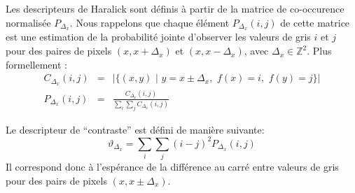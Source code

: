 \documentclass[11pt,addpoints]{exam}
\begin{document}
\begin{questions}
Les descripteurs de Haralick sont définis à partir de la matrice de
co-occurence normalisée $P_{\Delta_x}$. Nous rappelons que chaque élément
$P_{\Delta_x}(i,j)$ de cette matrice est une estimation de la probabilité jointe
d'observer les valeurs de gris $i$ et $j$ pour des paires de pixels
$(x,x+\Delta_x)$ et $(x,x-\Delta_x)$, avec $\Delta_x \in
\mathbb{Z}^2$. Plus formellement :  
\begin{eqnarray*}
C_{\Delta_x}(i,j) &=& |\{(x,y) \,\,| \,\, y=x \pm \Delta_x, \,\, f(x)=i,
\,\, f(y)=j \}| \\
P_{\Delta_x}(i,j) &=& \frac{C_{\Delta_x}(i,j)}{\sum_i\sum_j C_{\Delta_x}(i,j)}
\end{eqnarray*} 


Le descripteur de ``contraste'' est défini de manière suivante: 
\begin{equation}\label{equ:haralick_contrast}
\vartheta_{\Delta_x} = \sum_i\sum_j(i-j)^2P_{\Delta_x}(i,j)
\end{equation}
Il correspond donc à l'espérance de la différence au carré entre
valeurs de gris pour des pairs de pixels $(x, x \pm \Delta_x)$. 




\end{questions}
\end{document}
